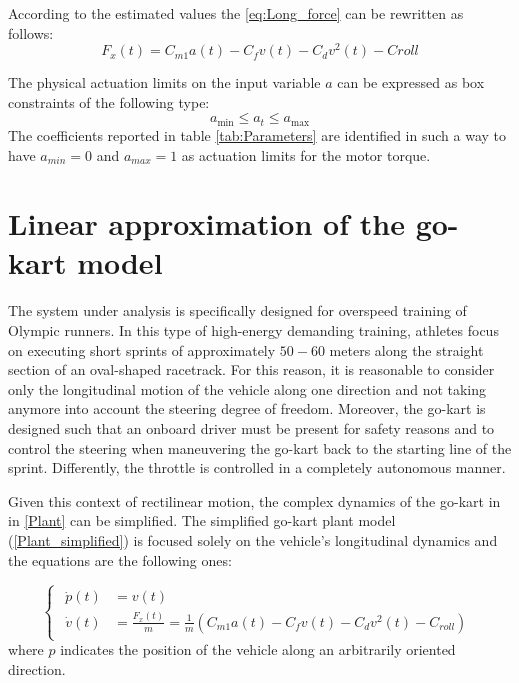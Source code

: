\documentclass[a4paper,12pt,oneside]{book}
\begin{document}
According to the estimated values the \eqref{eq:Long_force} can be rewritten as follows:
\begin{equation}
    F_x(t) = C_{m1} a(t) - C_f v(t) - C_d v^2(t) - Croll
\end{equation}

The physical actuation limits on the input variable $a$ can be expressed as box constraints of the following type:
\begin{equation}
    a_{\text{min}} \leq a_t \leq a_{\text{max}}
\label{Input_limits}
\end{equation}
The coefficients reported in table \ref{tab:Parameters} are identified in such a way to have $a_{min} = 0$ and $a_{max} = 1$ as actuation limits for the motor torque.

\section{Linear approximation of the go-kart model}
The system under analysis is specifically designed for overspeed training of Olympic runners.
In this type of high-energy demanding training, athletes focus on executing short sprints of approximately $50-60$ meters along the straight section of an oval-shaped racetrack.
For this reason, it is reasonable to consider only the longitudinal motion of the vehicle along one direction and not taking anymore into account the steering degree of freedom. 
Moreover, the go-kart is designed such that an onboard driver must be present for safety reasons and to control the steering when maneuvering the go-kart back to the starting line of the sprint.
Differently, the throttle is controlled in a completely autonomous manner.

\bigskip
Given this context of rectilinear motion, the complex dynamics of the go-kart in in \eqref{Plant} can be simplified. 
The simplified go-kart plant model (\ref{Plant_simplified}) is focused solely on the vehicle's longitudinal dynamics and the equations are the following ones:

\begin{equation}
\begin{cases}
 	\begin{aligned}
		\dot{p}(t) &= v(t) \\
		\dot{v}(t) &= \frac{F_x(t)}{m} = \frac{1}{m} (C_{m1} a(t) - C_f v(t) - C_d v^2(t) - C_{roll} )
	\end{aligned}
\end{cases}
\label{Plant_simplified}
\end{equation}
where $p$ indicates the position of the vehicle along an arbitrarily oriented direction.
\end{document}
